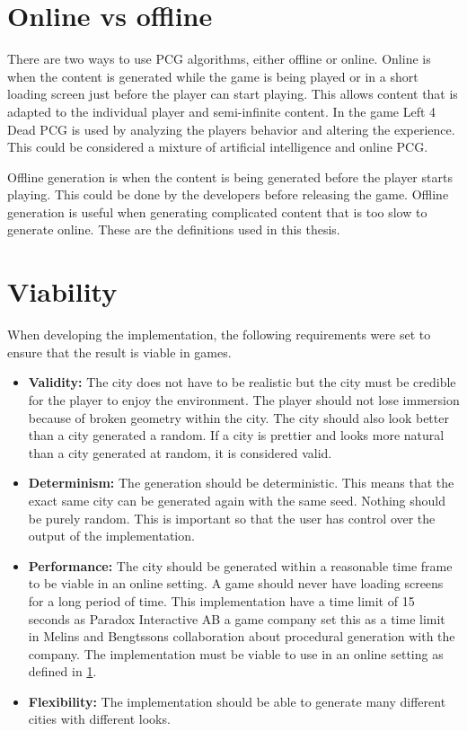 \section{Online vs offline}\label{sec:online-offline}
There are two ways to use PCG algorithms, either offline or online. Online is when the content is generated while the game is being played or in a short loading screen just before the player can start playing. This allows content that is adapted to the individual player and semi-infinite content\cite{PCGGames}. In the game Left 4 Dead\cite{Left4Dead} PCG is used by analyzing the players behavior and altering the experience. This could be considered a mixture of artificial intelligence and online PCG.
\par
Offline generation is when the content is being generated before the player starts playing. This could be done by the developers before releasing the game. Offline generation is useful when generating complicated content that is too slow to generate online. These are the definitions used in this thesis.
	
\section{Viability}\label{sec:viability}
When developing the implementation, the following requirements were set to ensure that the result is viable in games.
	
\begin{itemize}
	\item \textbf{Validity:} The city does not have to be realistic but the city must be credible for the player to enjoy the environment. The player should not lose immersion because of broken geometry within the city. The city should also look better than a city generated a random. If a city is prettier and looks more natural than a city generated at random, it is considered valid.
		
	\item \textbf{Determinism:} The generation should be deterministic. This means that the exact same city can be generated again with the same seed. Nothing should be purely random. This is important so that the user has control over the output of the implementation.
		
	\item \textbf{Performance:} The city should be generated within a reasonable time frame to be viable in an online setting. A game should never have loading screens for a long period of time. This implementation have a time limit of 15 seconds as Paradox Interactive AB a game company set this as a time limit in Melins and Bengtssons collaboration about procedural generation with the company\cite{FloorPlanPCG}. The implementation must be viable to use in an online setting as defined in \ref{sec:online-offline}.
		
	\item \textbf{Flexibility: } The implementation should be able to generate many different cities with different looks.
\end{itemize} 

